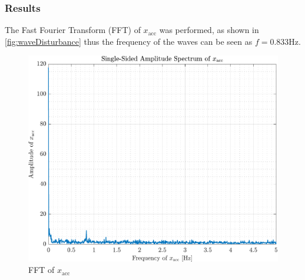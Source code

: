 \subsubsection*{Results}
The Fast Fourier Transform (FFT) of $x_\mathrm{acc}$ was performed, as shown in \autoref{fig:waveDisturbance} thus the frequency of the waves can be seen as $f = 0.833 \mathrm{Hz}$.
%
\begin{figure}[H]
   \includegraphics[width=.7\textwidth]{figures/waveDisturbance}
   \caption{FFT of $x_\mathrm{acc}$}
   \label{fig:waveDisturbance}
\end{figure}
